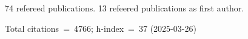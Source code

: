 74 refereed publications. 13 refeered publications as first author.

Total citations~=~4766; h-index~=~37 (2025-03-26)